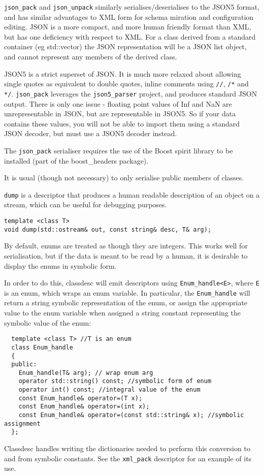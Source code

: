 
\verb+json_pack+ and \verb+json_unpack+ similarly
serialises/deserialises to the JSON5 format, and has similar
advantages to XML form for schema miration and configuration
editing. JSON is a more compact, and more human friendly format than
XML, but has one deficiency with respect to XML. For a class derived
from a standard container (eg std::vector) the JSON representation
will be a JSON list object, and cannot represent any members of the
derived class.

JSON5 is a strict superset of JSON. It is much more relaxed about
allowing single quotes as equivalent to double quotes, inline comments
using \verb+//+, \verb+/*+ and \verb+*/+. \verb+json_pack+ leverages
the \verb+json5_parser+ project, and produces standard JSON
output. There is only one issue - floating point values of Inf and NaN
are unrepresentable in JSON, but are representable in JSON5. So if
your data contains these values, you will not be able to import them
using a standard JSON decoder, but must use a JSON5 decoder instead.

The \verb+json_pack+ serialiser requires the use of the Boost spirit
library to be installed (part of the boost\_headers package).

It is usual (though not necessary) to only serialise public members of classes.


\verb+dump+ is a descriptor that produces a human readable description of
an object on a stream, which can be useful for debugging purposes.
\begin{verbatim}
template <class T>
void dump(std::ostream& out, const string& desc, T& arg); 
\end{verbatim}

\label{symbolic enums}

By default, enums are treated as though they are integers. This works
well for serialisation, but if the data is meant to be read by a
human, it is desirable to display the enums in symbolic form.

In order to do this, classdesc will emit descriptors using
\verb+Enum_handle<E>+, where \verb+E+ is an enum, which wraps an enum
variable. In particular, the \verb+Enum_handle+ will return a string
symbolic representation of the enum, or assign the appropriate value
to the enum variable when assigned a string constant representing the
symbolic value of the enum:
\begin{verbatim}
  template <class T> //T is an enum
  class Enum_handle
  {
  public:
    Enum_handle(T& arg); // wrap enum arg
    operator std::string() const; //symbolic form of enum
    operator int() const; //integral value of the enum
    const Enum_handle& operator=(T x);
    const Enum_handle& operator=(int x);
    const Enum_handle& operator=(const std::string& x); //symbolic assignment  
  };
\end{verbatim}
Classdesc handles writing the dictionaries needed to perform this
conversion to and from symbolic constants. See the \verb+xml_pack+
descriptor for an example of its use.

